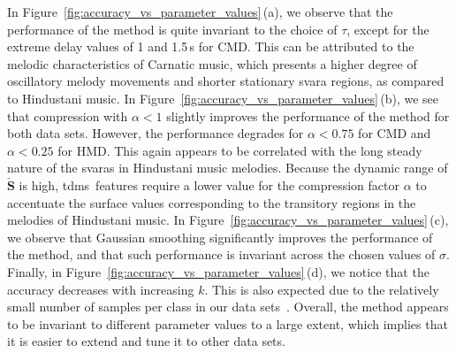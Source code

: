 In Figure~\ref{fig:accuracy_vs_parameter_values}\,(a), we observe that the performance of the method is quite invariant to the choice of $\tau$, except for the extreme delay values of 1 and 1.5\,s for CMD. This can be attributed to the melodic characteristics of Carnatic music, which presents a higher degree of oscillatory melody movements and shorter stationary svara regions, as compared to Hindustani music. In Figure~\ref{fig:accuracy_vs_parameter_values}\,(b), we see that compression with $\alpha < 1$ slightly improves the performance of the method for both data sets. However, the performance degrades for $\alpha < 0.75$ for  CMD and $\alpha < 0.25$ for  HMD. This again appears to be correlated with the long steady nature of the svaras in Hindustani music melodies. Because the dynamic range of $\check{\mathbf{S}}$ is high, \gls{tdms}\ features require a lower value for the compression factor $\alpha$ to accentuate the surface values corresponding to the transitory regions in the melodies of Hindustani music. In Figure~\ref{fig:accuracy_vs_parameter_values}\,(c), we observe that Gaussian smoothing significantly improves the performance of the method, and that such performance is invariant across the chosen values of $\sigma$. Finally, in Figure~\ref{fig:accuracy_vs_parameter_values}\,(d), we notice that the accuracy decreases with increasing $k$. This is also expected due to the relatively small number of samples per class in our data sets~\cite{Mitchell97BOOK}. %
Overall, the method appears to be invariant to different parameter values to a large extent, which implies that it is easier to extend and tune it to other data sets.

